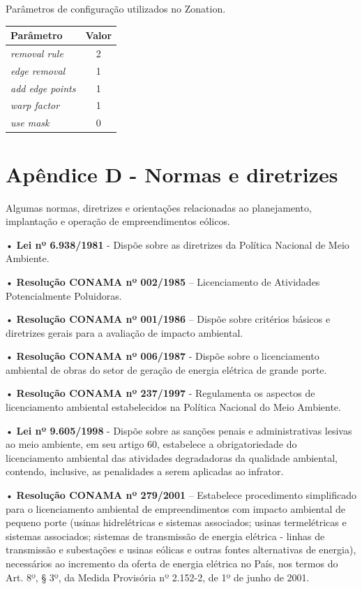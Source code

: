 \documentclass[
  oneside]{scrbook}
\begin{document}
Parâmetros de configuração utilizados no Zonation.

\begin{longtable}[t]{>{}lc}
\toprule
Parâmetro & Valor\\
\midrule
\em{removal rule} & 2\\
\em{edge removal} & 1\\
\em{add edge points} & 1\\
\em{warp factor} & 1\\
\em{use mask} & 0\\
\bottomrule
\end{longtable}

\newpage

\hypertarget{apuxeandice-d---normas-e-diretrizes}{%
\chapter{Apêndice D - Normas e diretrizes}\label{apuxeandice-d---normas-e-diretrizes}}

Algumas normas, diretrizes e orientações relacionadas ao planejamento, implantação e operação de empreendimentos eólicos.

• \textbf{Lei nº 6.938/1981} - Dispõe sobre as diretrizes da Política Nacional de Meio Ambiente.

• \textbf{Resolução CONAMA nº 002/1985} -- Licenciamento de Atividades Potencialmente Poluidoras.

• \textbf{Resolução CONAMA nº 001/1986} -- Dispõe sobre critérios básicos e diretrizes gerais para a avaliação de impacto ambiental.

• \textbf{Resolução CONAMA nº 006/1987} - Dispõe sobre o licenciamento ambiental de obras do setor de geração de energia elétrica de grande porte.

• \textbf{Resolução CONAMA nº 237/1997} - Regulamenta os aspectos de licenciamento ambiental estabelecidos na Política Nacional do Meio Ambiente.

• \textbf{Lei nº 9.605/1998} - Dispõe sobre as sanções penais e administrativas lesivas ao meio ambiente, em seu artigo 60, estabelece a obrigatoriedade do licenciamento ambiental das atividades degradadoras da qualidade ambiental, contendo, inclusive, as penalidades a serem aplicadas ao infrator.

• \textbf{Resolução CONAMA nº 279/2001} -- Estabelece procedimento simplificado para o licenciamento ambiental de empreendimentos com impacto ambiental de pequeno porte (usinas hidrelétricas e sistemas associados; usinas termelétricas e sistemas associados; sistemas de transmissão de energia elétrica - linhas de transmissão e subestações e usinas eólicas e outras fontes alternativas de energia), necessários ao incremento da oferta de energia elétrica no País, nos termos do Art. 8º, § 3º, da Medida Provisória nº 2.152-2, de 1º de junho de 2001.
\end{document}
